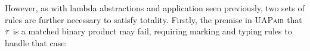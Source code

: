 \begin{mathpar}





\end{mathpar}

However, as with lambda abstractions and application seen previously, two sets of rules are further
necessary to satisfy totality. Firstly, the premise in \textsc{UAPair} that $\TMV$ is a matched
binary product may fail, requiring marking and typing rules to handle that case:
%
\begin{mathpar}

\end{mathpar}

